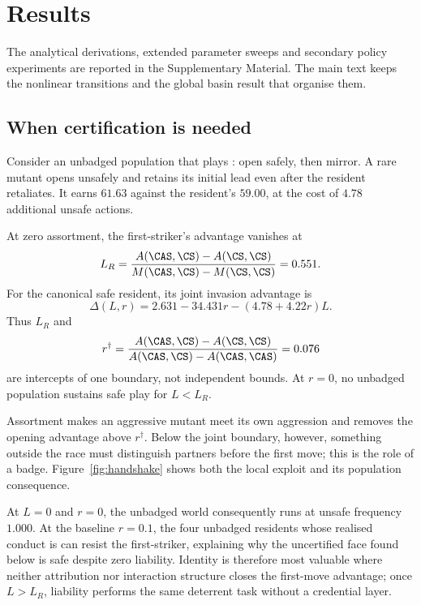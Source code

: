 \section{Results}
\label{sec:results}


The analytical derivations, extended parameter sweeps and secondary policy
experiments are reported in the Supplementary Material. The main text keeps
the nonlinear transitions and the global basin result that organise them.

\subsection{When certification is needed}
\label{sec:reciprocity}

Consider an unbadged population that plays \CS{}: open safely, then mirror. A
rare \CAS{} mutant opens unsafely and retains its initial lead even after the
resident retaliates. It earns $61.63$ against the resident's $59.00$, at the
cost of $4.78$ additional unsafe actions.

\begin{proposition}
\label{prop:reciprocity}
At zero assortment, the first-striker's advantage vanishes at
\begin{equation}
\label{eq:LR}
L_R=\frac{A(\CAS,\CS)-A(\CS,\CS)}
          {M(\CAS,\CS)-M(\CS,\CS)}=0.551.
\end{equation}
For the canonical safe resident, its joint invasion advantage is
\begin{equation}
\label{eq:jointfirststrike}
\Delta(L,r)=2.631-34.431r-(4.78+4.22r)L.
\end{equation}
Thus $L_R$ and
\begin{equation}
\label{eq:rdagger}
r^{\dagger}=\frac{A(\CAS,\CS)-A(\CS,\CS)}
 {A(\CAS,\CS)-A(\CAS,\CAS)}=0.076
\end{equation}
are intercepts of one boundary, not independent bounds. At $r=0$, no
unbadged population sustains safe play for $L<L_R$.
\end{proposition}

Assortment makes an aggressive mutant meet its own aggression and removes the
opening advantage above $r^{\dagger}$. Below the joint boundary, however,
something outside the race must distinguish partners before the first move;
this is the role of a badge. Figure~\ref{fig:handshake} shows both the local
exploit and its population consequence.

At $L=0$ and $r=0$, the unbadged world consequently runs at unsafe frequency
$1.000$. At the baseline $r=0.1$, the four unbadged residents whose realised
conduct is \CS{} can resist the first-striker, explaining why the uncertified
face found below is safe despite zero liability. Identity is therefore most
valuable where neither attribution nor interaction structure closes the
first-move advantage; once $L>L_R$, liability performs the same deterrent task
without a credential layer.

